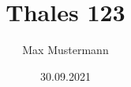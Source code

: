 \documentclass[12pt]{article}
\title{Thales 123}
\author{Max Mustermann}
\date{30.09.2021}
\begin{document}
\maketitle
\makehonesty
\tableofcontents
\newpage


\end{document}

